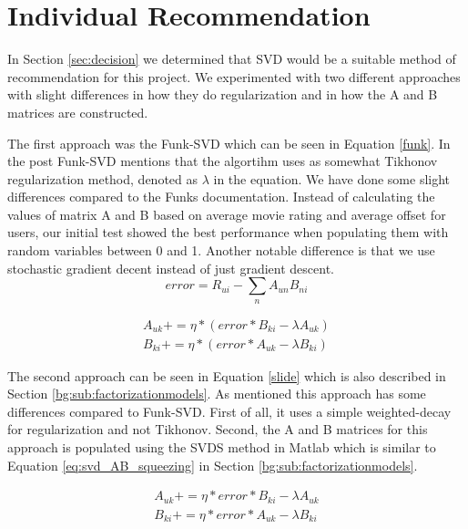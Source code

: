 \section{Individual Recommendation}\label{sec:individual_recommendation}
In Section \ref{sec:decision} we determined that SVD would be a suitable method of recommendation for this project. 
We experimented with two different approaches with slight differences in how they do regularization and in how the A and B matrices are constructed.

The first approach was the Funk-SVD which can be seen in Equation \ref{funk}\cite{svdsimonfunk}. In the post Funk-SVD mentions that the algortihm uses as somewhat Tikhonov regularization method, denoted as $\lambda$ in the equation. We have done some slight differences compared to the Funks documentation\cite{svdsimonfunk}. Instead of calculating the values of matrix A and B based on average movie rating and average offset for users, our initial test showed the best performance when populating them with random variables between 0 and 1. Another notable difference is that we use stochastic gradient decent instead of just gradient descent.
\begin{equation}
error = R_{ui} - \sum_n A_{un}B_{ni}
\end{equation}

\begin{equation}\label{funk}
\begin{aligned}
A_{uk} += \eta * (error * B_{ki} - \lambda A_{uk}) \\
B_{ki} += \eta * (error * A_{uk} - \lambda B_{ki})
\end{aligned}
\end{equation}

The second approach can be seen in Equation \ref{slide} which is also described in Section \ref{bg:sub:factorizationmodels}. As mentioned this approach has some differences compared to Funk-SVD. First of all, it uses a simple weighted-decay for regularization and not Tikhonov. Second, the A and B matrices for this approach is populated using the SVDS method in Matlab which is similar to Equation \ref{eq:svd_AB_squeezing} in Section \ref{bg:sub:factorizationmodels}.

\begin{equation}\label{slides}
\begin{aligned}
A_{uk} += \eta * error *B_{ki} - \lambda A_{uk} \\
B_{ki} += \eta * error *A_{uk} - \lambda B_{ki} 
\end{aligned}
\end{equation}

